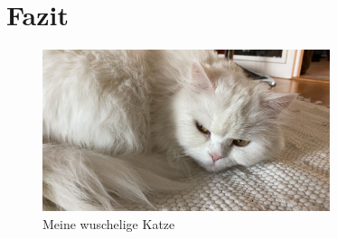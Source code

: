 \documentclass[12pt,parskip=half]{scrartcl}
\begin{document}
\blindtext[5] 



\section{Fazit}\label{sec:fazit}

\begin{figure}
\centering
\includegraphics[width=0.75\textwidth,angle=45]{Bilder/miau}
\caption{Meine wuschelige Katze}\label{fig:miau}
\end{figure}


\blindtext[5]
\end{document}
